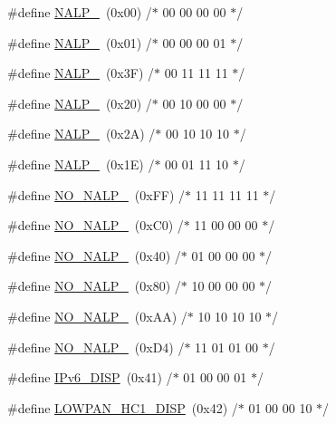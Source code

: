 \begin{DoxyCompactItemize}
\item 
\#define \hyperlink{tests-sixlowpan_8c_ae4beb984a88694d0cc94a483d9d1b4f8}{N\+A\+L\+P\+\_}~(0x00) /$\ast$ 00 00 00 00 $\ast$/
\item 
\#define \hyperlink{tests-sixlowpan_8c_adf8afe1f647bd8f6b01e73c269440b40}{N\+A\+L\+P\+\_}~(0x01) /$\ast$ 00 00 00 01 $\ast$/
\item 
\#define \hyperlink{tests-sixlowpan_8c_aa5982721a959e0ffaca902d67fb8f7c2}{N\+A\+L\+P\+\_}~(0x3\+F) /$\ast$ 00 11 11 11 $\ast$/
\item 
\#define \hyperlink{tests-sixlowpan_8c_a9dea5ea376b888e74be5ca7b68dbea0e}{N\+A\+L\+P\+\_}~(0x20) /$\ast$ 00 10 00 00 $\ast$/
\item 
\#define \hyperlink{tests-sixlowpan_8c_ae7491b303f7930c51949a670e49e5624}{N\+A\+L\+P\+\_}~(0x2\+A) /$\ast$ 00 10 10 10 $\ast$/
\item 
\#define \hyperlink{tests-sixlowpan_8c_a6888f8bee6114497fb096ba13322263e}{N\+A\+L\+P\+\_}~(0x1\+E) /$\ast$ 00 01 11 10 $\ast$/
\item 
\#define \hyperlink{tests-sixlowpan_8c_ae1b4539bc0393624dc0b578959871eac}{N\+O\+\_\+\+N\+A\+L\+P\+\_}~(0x\+F\+F)  /$\ast$ 11 11 11 11 $\ast$/
\item 
\#define \hyperlink{tests-sixlowpan_8c_a1aedd28873ee9f4d8c62707344b0095a}{N\+O\+\_\+\+N\+A\+L\+P\+\_}~(0x\+C0)  /$\ast$ 11 00 00 00 $\ast$/
\item 
\#define \hyperlink{tests-sixlowpan_8c_aa33605dbb456c07409eebba2d3d23817}{N\+O\+\_\+\+N\+A\+L\+P\+\_}~(0x40)  /$\ast$ 01 00 00 00 $\ast$/
\item 
\#define \hyperlink{tests-sixlowpan_8c_a7dd11c37a531978dd95e6f88897abbc3}{N\+O\+\_\+\+N\+A\+L\+P\+\_}~(0x80)  /$\ast$ 10 00 00 00 $\ast$/
\item 
\#define \hyperlink{tests-sixlowpan_8c_af32872c089ca02524b1f20185e7f28c3}{N\+O\+\_\+\+N\+A\+L\+P\+\_}~(0x\+A\+A)  /$\ast$ 10 10 10 10 $\ast$/
\item 
\#define \hyperlink{tests-sixlowpan_8c_a7dac4ced9fe61c820c5e62f90d4224fb}{N\+O\+\_\+\+N\+A\+L\+P\+\_}~(0x\+D4)  /$\ast$ 11 01 01 00 $\ast$/
\item 
\#define \hyperlink{tests-sixlowpan_8c_a88c8ad3cadbd86b7b27bef927c0c12c2}{I\+Pv6\+\_\+\+D\+I\+SP}~(0x41)  /$\ast$ 01 00 00 01 $\ast$/
\item 
\#define \hyperlink{tests-sixlowpan_8c_aa4b0489582c32be53b049a664e45ab99}{L\+O\+W\+P\+A\+N\+\_\+\+H\+C1\+\_\+\+D\+I\+SP}~(0x42)  /$\ast$ 01 00 00 10 $\ast$/

\end{DoxyCompactItemize}
